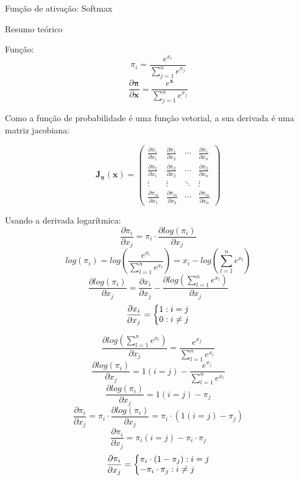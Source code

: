 \documentclass{article}
\begin{document}
\centerline{\sc \large Função de ativação: Softmax}
\vspace{.5pc}
\centerline{\sc Resumo teórico}
\vspace{4pc}

Função:
\[ \pi_i = \frac{e^{x_i}}{\sum_{j=1}^{n} e^{x_j}} \]
\[ \frac{\partial \mathbf{\pi}}{\partial \mathbf{x}} = \frac{e^{\mathbf{x}}}{\sum_{j=1}^{n} e^{x_j}} \]
\vspace{3pc}

Como a função de probabilidade é uma função vetorial, a sua derivada é uma matriz jacobiana:

\begin{equation*}
\mathbf{J_{\pi}}(\mathbf{x}) = 
\begin{pmatrix}
\frac{\partial \pi_1}{\partial x_1} & \frac{\partial \pi_1}{\partial x_2} & \cdots & \frac{\partial \pi_1}{\partial x_n} \\
\frac{\partial \pi_2}{\partial x_1} & \frac{\partial \pi_2}{\partial x_2} & \cdots & \frac{\partial \pi_2}{\partial x_n} \\
\vdots  & \vdots  & \ddots & \vdots  \\
\frac{\partial \pi_m}{\partial x_1} & \frac{\partial \pi_m}{\partial x_2} & \cdots & \frac{\partial \pi_m}{\partial x_n}
\end{pmatrix}
\end{equation*}

Usando a derivada logarítmica:
\[ \frac{\partial \pi_i}{\partial x_j} = \pi_i \cdot \frac{\partial log(\pi_i)}{\partial x_j} \]
\[ log(\pi_i) = log(\frac{e^{x_i}}{\sum_{l=1}^{n} e^{x_l}}) = x_i - log(\sum_{l=1}^{n} e^{x_l})\]
\[ \frac{\partial log(\pi_i)}{\partial x_j} = \frac{\partial x_i}{\partial x_j} - \frac{\partial log(\sum_{l=1}^{n} e^{x_l})}{\partial x_j} \]
\[ \frac{\partial x_i}{\partial x_j} = \left\{\begin{array}{@{}l@{}}
    1 : i = j
    \\
    0 : i \neq j
  \end{array}\right. \]

\[ \frac{\partial log(\sum_{l=1}^{n} e^{x_l})}{\partial x_j} = \frac{e^{x_j}}{\sum_{l=1}^{n} e^{x_l}} \]
\[ \frac{\partial log(\pi_i)}{\partial x_j} = 1(i=j) - \frac{e^{x_j}}{\sum_{l=1}^{n} e^{x_l}} \]
\[ \frac{\partial log(\pi_i)}{\partial x_j} = 1(i=j) - \pi_j \]
\[ \frac{\partial \pi_i}{\partial x_j} = \pi_i \cdot \frac{\partial log(\pi_i)}{\partial x_j} = \pi_i \cdot (1(i=j) - \pi_j)  \]
\[ \frac{\partial \pi_i}{\partial x_j} = \pi_i(i=j) - \pi_i \cdot \pi_j  \]
\[ \frac{\partial \pi_i}{\partial x_j} = \left\{\begin{array}{@{}l@{}}
    \pi_i \cdot (1 - \pi_j) : i = j
    \\
    - \pi_i \cdot \pi_j : i \neq j
  \end{array}\right.  \]
\end{document}
